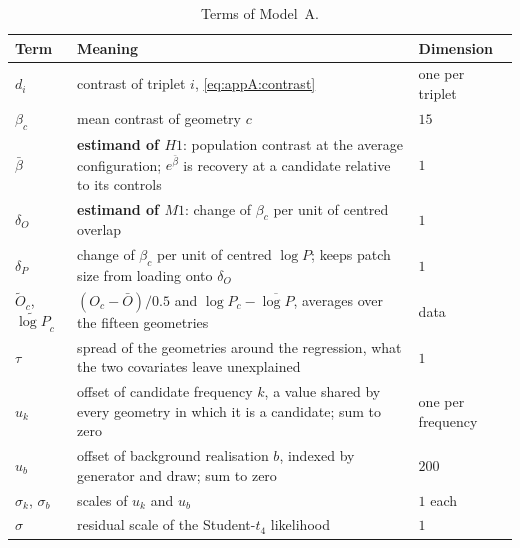 \begin{table}[!tbp]
    \centering
    \small
    \setlength{\tabcolsep}{4pt}
    \renewcommand{\arraystretch}{1.2}
    \begin{tabular}{@{}lM{9.6cm}l@{}}
        \toprule
        \textbf{Term} & \textbf{Meaning} & \textbf{Dimension} \\
        \midrule
        $d_i$ & contrast of triplet $i$, \autoref{eq:appA:contrast} & one per triplet \\
        \rowsep%
        $\beta_c$ & mean contrast of geometry $c$ & $15$ \\
        \rowsep%
        $\bar\beta$ & \textbf{estimand of $H1$}: population contrast at the average configuration; $e^{\bar\beta}$ is recovery at a candidate relative to its controls & $1$ \\
        \rowsep%
        $\delta_O$ & \textbf{estimand of $M1$}: change of $\beta_c$ per unit of centred overlap & $1$ \\
        \rowsep%
        $\delta_P$ & change of $\beta_c$ per unit of centred $\log P$; keeps patch size from loading onto $\delta_O$ & $1$ \\
        \rowsep%
        $\widetilde O_c$, $\widetilde{\log P}_c$ & $(O_c-\bar O)/0.5$ and $\log P_c-\overline{\log P}$, averages over the fifteen geometries & data \\
        \rowsep%
        $\tau$ & spread of the geometries around the regression, what the two covariates leave unexplained & $1$ \\
        \midrule
        $u_k$ & offset of candidate frequency $k$, a value shared by every geometry in which it is a candidate; sum to zero & one per frequency \\
        \rowsep%
        $u_b$ & offset of background realisation $b$, indexed by generator and draw; sum to zero & $200$ \\
        \rowsep%
        $\sigma_k$, $\sigma_b$ & scales of $u_k$ and $u_b$ & $1$ each \\
        \rowsep%
        $\sigma$ & residual scale of the Student-$t_4$ likelihood & $1$ \\
        \bottomrule
    \end{tabular}
    \caption{Terms of Model~A.}%
    \label{tab:termsA}
\end{table}
